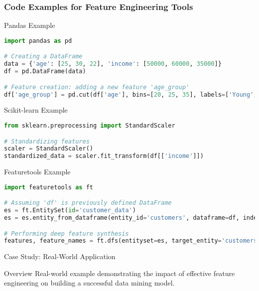 \documentclass[aspectratio=169]{beamer}
\begin{document}
\begin{frame}[fragile]
    \frametitle{Code Examples for Feature Engineering Tools}
    \begin{block}{Pandas Example}
        \begin{lstlisting}[language=Python]
import pandas as pd

# Creating a DataFrame
data = {'age': [25, 30, 22], 'income': [50000, 60000, 35000]}
df = pd.DataFrame(data)

# Feature creation: adding a new feature 'age_group'
df['age_group'] = pd.cut(df['age'], bins=[20, 25, 35], labels=['Young', 'Adult'])
        \end{lstlisting}
    \end{block}
    
    \begin{block}{Scikit-learn Example}
        \begin{lstlisting}[language=Python]
from sklearn.preprocessing import StandardScaler

# Standardizing features
scaler = StandardScaler()
standardized_data = scaler.fit_transform(df[['income']])
        \end{lstlisting}
    \end{block}
    
    \begin{block}{Featuretools Example}
        \begin{lstlisting}[language=Python]
import featuretools as ft

# Assuming 'df' is previously defined DataFrame
es = ft.EntitySet(id='customer_data')
es = es.entity_from_dataframe(entity_id='customers', dataframe=df, index='index_column')

# Performing deep feature synthesis
features, feature_names = ft.dfs(entityset=es, target_entity='customers')
        \end{lstlisting}
    \end{block}
\end{frame}

\begin{frame}{Case Study: Real-World Application}
    \begin{block}{Overview}
        Real-world example demonstrating the impact of effective feature engineering on building a successful data mining model.
    \end{block}
\end{frame}
\end{document}
